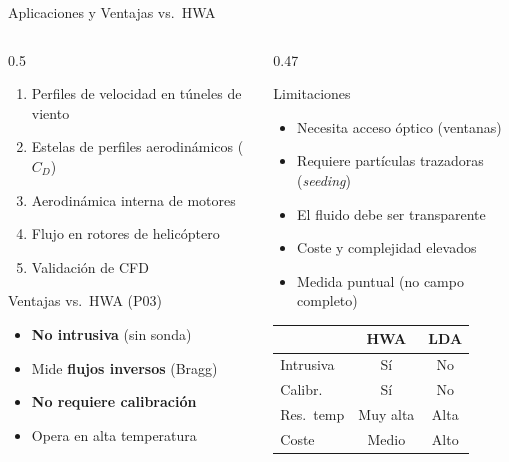 \documentclass[aspectratio=169,12pt]{beamer}
\begin{document}
\begin{frame}{Aplicaciones y Ventajas vs.\ HWA}
	\begin{columns}
		\begin{column}{0.5\textwidth}
			\begin{enumerate}\small
				\item Perfiles de velocidad en túneles de viento
				\item Estelas de perfiles aerodinámicos ($C_D$)
				\item Aerodinámica interna de motores
				\item Flujo en rotores de helicóptero
				\item Validación de CFD
			\end{enumerate}
			\vspace{0.3em}
			\begin{exampleblock}{Ventajas vs.\ HWA (P03)}
				\begin{itemize}\small
					\item \textbf{No intrusiva} (sin sonda)
					\item Mide \textbf{flujos inversos} (Bragg)
					\item \textbf{No requiere calibración}
					\item Opera en alta temperatura
				\end{itemize}
			\end{exampleblock}
		\end{column}
		\begin{column}{0.47\textwidth}
			\begin{alertblock}{Limitaciones}
				\begin{itemize}\small
					\item Necesita acceso óptico (ventanas)
					\item Requiere partículas trazadoras
					      (\emph{seeding})
					\item El fluido debe ser transparente
					\item Coste y complejidad elevados
					\item Medida puntual (no campo completo)
				\end{itemize}
			\end{alertblock}
			\vspace{0.3em}
			\centering\scriptsize
			\begin{tabular}{lcc}
				\toprule
				           & \textbf{HWA} & \textbf{LDA} \\
				\midrule
				Intrusiva  & Sí           & No           \\
				Calibr.    & Sí           & No           \\
				Res.\ temp & Muy alta     & Alta         \\
				Coste      & Medio        & Alto         \\
				\bottomrule
			\end{tabular}
		\end{column}
	\end{columns}
\end{frame}
\end{document}
